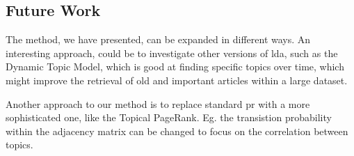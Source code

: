 \subsection{Future Work}\label{sec:future_work}

The method, we have presented, can be expanded in different ways. 
An interesting approach, could be to investigate other versions of \gls{lda}, such as the Dynamic Topic Model\cite{blei2006dynamic}, which is good at finding specific topics over time, which might improve the retrieval of old and important articles within a large dataset.

Another approach to our method is to replace standard \gls{pr} with a more sophisticated one, like the Topical PageRank\cite{yang2009topic}. 
Eg. the transistion probability within the adjacency matrix can be changed to focus on the correlation between topics.
